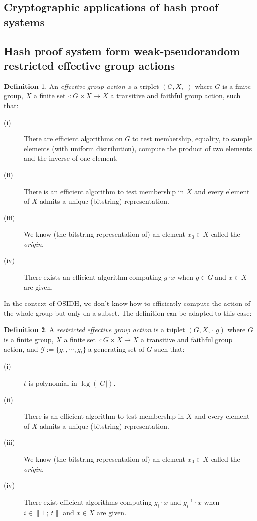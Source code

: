\documentclass[a4paper,10pt]{report}
\theoremstyle{definition}
\newtheorem{Definition}{Definition}[chapter]
\theoremstyle{plain}
\theoremstyle{definition}
\newcommand{\m}[1]{\mathcal{#1}}
\renewcommand{\i}[2]{\left\llbracket #1~;~#2\right\rrbracket}
\renewcommand{\(}{\left(}
\renewcommand{\)}{\right)}
\begin{document}
\subsection{Cryptographic applications of hash proof systems}

\subsection{Hash proof system form weak-pseudorandom restricted effective group actions}

\begin{Definition}\cite[Definition 2]{DeFeo1}
An \emph{effective group action} is a triplet $(G,X,\cdot)$ where $G$ is a finite group, $X$ a finite set $\cdot : G\times X\longrightarrow X$ a transitive and faithful group action, such that:
\begin{description}
\item[(i)] There are efficient algorithms on $G$ to test membership, equality,  to sample elements (with uniform distribution), compute the product of two elements and the inverse of one element.
\item[(ii)] There is an efficient algorithm to test membership in $X$ and every element of $X$ admits a unique (bitstring) representation.
\item[(iii)] We know (the bitstring representation of) an element $x_0\in X$ called the \emph{origin}.
\item[(iv)] There exists an efficient algorithm computing $g\cdot x$ when $g\in G$ and $x\in X$ are given.
\end{description}
\end{Definition}

In the context of OSIDH, we don't know how to efficiently compute the action of the whole group but only on a subset. The definition can be adapted to this case:

\begin{Definition}\cite[Definition 6]{DeFeo1}
A \emph{restricted effective group action} is a triplet $(G,X,\cdot,g)$ where $G$ is a finite group, $X$ a finite set $\cdot : G\times X\longrightarrow X$ a transitive and faithful group action, and $\m{G}:=\{g_1,\cdots, g_t\}$ a generating set of $G$ such that:
\begin{description}
\item[(i)] $t$ is polynomial in $\log(|G|)$.
\item[(ii)] There is an efficient algorithm to test membership in $X$ and every element of $X$ admits a unique (bitstring) representation.
\item[(iii)] We know (the bitstring representation of) an element $x_0\in X$ called the \emph{origin}.
\item[(iv)] There exist efficient algorithms computing $g_i\cdot x$ and $g_i^{-1}\cdot x$ when $i\in\i{1}{t}$ and $x\in X$ are given.
\end{description}
\end{Definition}
\end{document}
